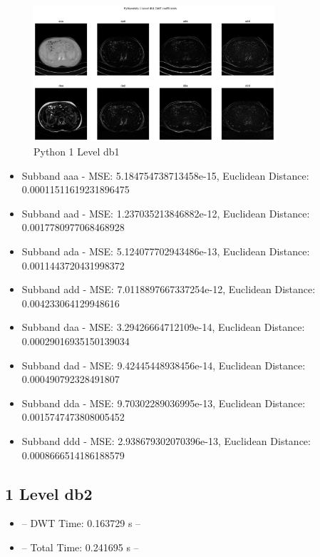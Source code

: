 \documentclass{article}
\begin{document}
\begin{figure}[H]
    \centering
    \includegraphics[width=0.8\textwidth]{assets/py-1-db1.png}
    \caption{Python 1 Level db1}
    \label{fig10}
\end{figure}

\begin{itemize}
    \item Subband aaa - MSE: 5.184754738713458e-15, Euclidean Distance: 0.00011511619231896475
    \item Subband aad - MSE: 1.237035213846882e-12, Euclidean Distance: 0.0017780977068468928
    \item Subband ada - MSE: 5.124077702943486e-13, Euclidean Distance: 0.0011443720431998372
    \item Subband add - MSE: 7.0118897667337254e-12, Euclidean Distance: 0.004233064129948616
    \item Subband daa - MSE: 3.29426664712109e-14, Euclidean Distance: 0.00029016935150139034
    \item Subband dad - MSE: 9.42445448938456e-14, Euclidean Distance: 0.000490792328491807
    \item Subband dda - MSE: 9.70302289036995e-13, Euclidean Distance: 0.0015747473808005452
    \item Subband ddd - MSE: 2.938679302070396e-13, Euclidean Distance: 0.0008666514186188579
\end{itemize}

\subsection{1 Level db2}
\begin{itemize}
    \item -- DWT Time: 0.163729 s --
    \item -- Total Time: 0.241695 s --
\end{itemize}
\end{document}
